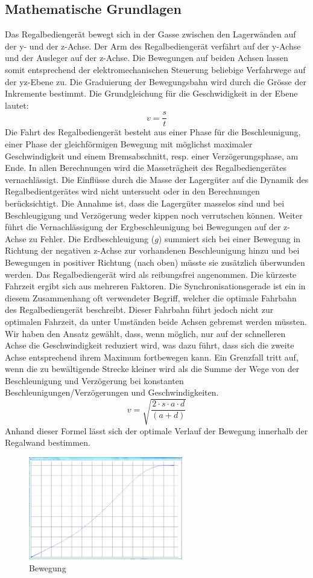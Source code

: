 \subsection{Mathematische Grundlagen}
Das Regalbediengerät bewegt sich in der Gasse zwischen den Lagerwänden auf der y- und der z-Achse. Der Arm des Regalbediengerät verfährt auf der y-Achse und der Ausleger auf der z-Achse. Die Bewegungen auf beiden Achsen lassen somit entsprechend der elektromechanischen Steuerung beliebige Verfahrwege auf der yz-Ebene zu. Die Graduierung der Bewegungsbahn wird durch die Grösse der Inkremente bestimmt.
%
Die Grundgleichung für die Geschwidigkeit in der Ebene lautet:
%
\begin{equation}
v = \frac{s}{t}
\end{equation}
%
Die Fahrt des Regalbediengerät besteht aus einer Phase für die Beschleunigung, einer Phase der gleichförmigen Bewegung mit möglichst maximaler Geschwindigkeit und einem Bremsabschnitt, resp. einer Verzögerungsphase, am Ende. In allen Berechnungen wird die Masseträgheit des Regalbediengerätes vernachlässigt. Die Einflüsse durch die Masse der Lagergüter auf die Dynamik des Regalbedientgerätes wird nicht untersucht oder in den Berechnungen berücksichtigt. Die Annahme ist, dass die Lagergüter masselos sind und bei Beschleugigung und Verzögerung weder kippen noch verrutschen können. Weiter führt die Vernachlässigung der Ergbeschleunigung bei Bewegungen auf der z-Achse zu Fehler. Die Erdbeschleuigung ($ g $) summiert sich bei einer Bewegung in Richtung der negativen z-Achse zur vorhandenen Beschleunigung hinzu und bei Bewegungen in positiver Richtung (nach oben) müsste sie zusätzlich überwunden werden. Das Regalbediengerät wird als reibungsfrei angenommen.
%
Die kürzeste Fahrzeit ergibt sich aus mehreren Faktoren. Die Synchronisationsgerade ist ein in diesem Zusammenhang oft verwendeter Begriff, welcher die optimale Fahrbahn des Regalbediengerät beschreibt. Dieser Fahrbahn führt jedoch nicht zur optimalen Fahrzeit, da unter Umständen beide Achsen gebremst werden müssten. Wir haben den Ansatz gewählt, dass, wenn möglich, nur auf der schnelleren Achse die Geschwindigkeit reduziert wird, was dazu führt, dass sich die zweite Achse entsprechend ihrem Maximum fortbewegen kann.
%
Ein Grenzfall tritt auf, wenn die zu bewältigende Strecke kleiner wird als die Summe der Wege von der Beschleunigung und Verzögerung bei konstanten Beschleunigungen/Verzögerungen und Geschwindigkeiten. 
%
\begin{equation}
v = \sqrt{\frac{2 \cdot s \cdot a \cdot d}{(a+d)}}
\end{equation}
%
Anhand dieser Formel lässt sich der optimale Verlauf der Bewegung innerhalb der Regalwand bestimmen.
%
\begin{figure}[H]
  \begin{center}
    \includegraphics[width=0.6\textwidth]{images/motion.png}
    \caption{Bewegung}
    \label{fig:beweg}
  \end{center}
\end{figure}
%
